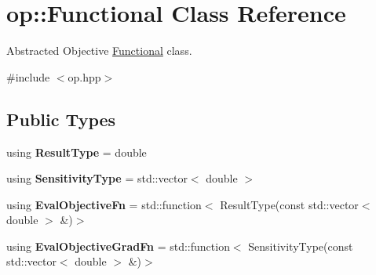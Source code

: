 \hypertarget{classop_1_1Functional}{\section{op\-:\-:Functional Class Reference}
\label{classop_1_1Functional}
}


Abstracted Objective \hyperlink{classop_1_1Functional}{Functional} class.  




{\ttfamily \#include $<$op.\-hpp$>$}

\subsection*{Public Types}
\begin{DoxyCompactItemize}
\item 
\hypertarget{classop_1_1Functional_a39e33bc5709a67d86abc38e1420fed6b}{using {\bfseries Result\-Type} = double}\label{classop_1_1Functional_a39e33bc5709a67d86abc38e1420fed6b}

\item 
\hypertarget{classop_1_1Functional_a914b7402a8586121b649cbcdc9903557}{using {\bfseries Sensitivity\-Type} = std\-::vector$<$ double $>$}\label{classop_1_1Functional_a914b7402a8586121b649cbcdc9903557}

\item 
\hypertarget{classop_1_1Functional_af045bc7a286ca26f3bfa3e0daf0f0643}{using {\bfseries Eval\-Objective\-Fn} = std\-::function$<$ Result\-Type(const std\-::vector$<$ double $>$ \&)$>$}\label{classop_1_1Functional_af045bc7a286ca26f3bfa3e0daf0f0643}

\item 
\hypertarget{classop_1_1Functional_a84a179364b5b081a3f60924d01d9fef2}{using {\bfseries Eval\-Objective\-Grad\-Fn} = std\-::function$<$ Sensitivity\-Type(const std\-::vector$<$ double $>$ \&)$>$}\label{classop_1_1Functional_a84a179364b5b081a3f60924d01d9fef2}

\end{DoxyCompactItemize}
